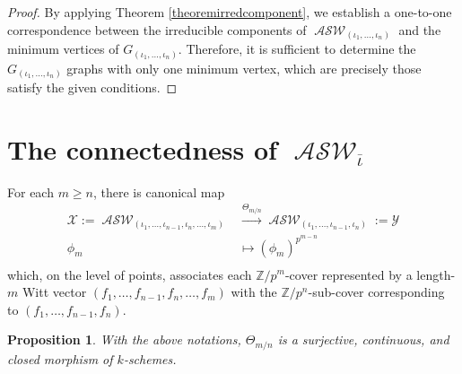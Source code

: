 \documentclass{compositio}
\newtheorem{proposition}[theorem]{Proposition}
\theoremstyle{remark}
\theoremstyle{remark}
\DeclareMathOperator{\ASW}{\mathcal{ASW}}
\begin{document}
\begin{proof}
By applying Theorem \ref{theoremirredcomponent}, we establish a one-to-one correspondence between the irreducible components of $\ASW_{({\iota_1, \ldots, \iota_n})}$ and the minimum vertices of $G_{({\iota_1, \ldots, \iota_n})}$. Therefore, it is sufficient to determine the $G_{({\iota_1, \ldots, \iota_n})}$ graphs with only one minimum vertex, which are precisely those satisfy the given conditions.
\end{proof}

\section{The connectedness of \texorpdfstring{$\ASW_{\overline{\iota}}$}{}}
\label{secconnectedness}



For each $m\ge n$, there is canonical map
\begin{equation*}
\begin{split}
     \mathscr{X}:= \ASW_{(\iota_1, \ldots, \iota_{n-1}, \iota_n, \ldots, \iota_m)} & \xrightarrow{\Theta_{m/n}} \ASW_{(\iota_1, \ldots, 
     \iota_{n-1}, \iota_n)}:=\mathscr{Y}\\
    \phi_m & \longmapsto{} (\phi_m)^{p^{m-n}}  \\
\end{split}
\end{equation*}
which, on the level of points, associates each $\mathbb{Z}/p^m$-cover represented by a length-$m$ Witt vector $(f_1, \ldots, f_{n-1},\allowbreak f_n, \ldots, f_m)$ with the $\mathbb{Z}/p^n$-sub-cover corresponding to $(f_1, \ldots, f_{n-1},\allowbreak f_n)$.


\begin{proposition}
With the above notations, $\Theta_{m/n}$ is a surjective, continuous, and closed morphism of $k$-schemes.
\end{proposition}
\end{document}
